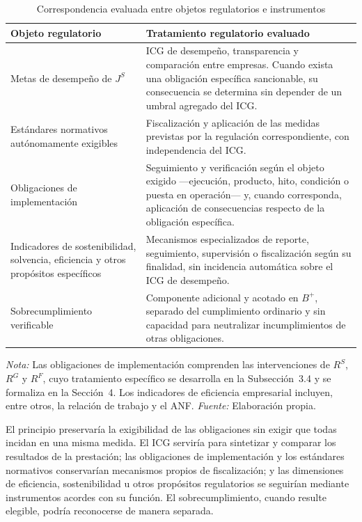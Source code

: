 \begin{table}[!t]
\centering
\caption{Correspondencia evaluada entre objetos regulatorios e instrumentos}
\label{tab:separacion_instrumentos}
\small
\renewcommand{\arraystretch}{1.20}
\setlength{\tabcolsep}{5pt}
\begin{tabularx}{\columnwidth}{@{}p{}X@{}}
\hline
\textbf{Objeto regulatorio} & \textbf{Tratamiento regulatorio evaluado} \\
\hline
Metas de desempeño de \(J^{S}\) &
ICG de desempeño, transparencia y comparación entre empresas. Cuando exista una obligación específica sancionable, su consecuencia se determina sin depender de un umbral agregado del ICG. \\
Estándares normativos autónomamente exigibles &
Fiscalización y aplicación de las medidas previstas por la regulación correspondiente, con independencia del ICG. \\
Obligaciones de implementación &
Seguimiento y verificación según el objeto exigido ---ejecución, producto, hito, condición o puesta en operación--- y, cuando corresponda, aplicación de consecuencias respecto de la obligación específica. \\
Indicadores de sostenibilidad, solvencia, eficiencia y otros propósitos específicos &
Mecanismos especializados de reporte, seguimiento, supervisión o fiscalización según su finalidad, sin incidencia automática sobre el ICG de desempeño. \\
Sobrecumplimiento verificable &
Componente adicional y acotado en \(B^{+}\), separado del cumplimiento ordinario y sin capacidad para neutralizar incumplimientos de otras obligaciones. \\
\hline
\end{tabularx}
\begin{flushleft}
\footnotesize
\textit{Nota:} Las obligaciones de implementación comprenden las intervenciones de \(R^{S}\), \(R^{G}\) y \(R^{F}\), cuyo tratamiento específico se desarrolla en la Subsección~3.4 y se formaliza en la Sección~4. Los indicadores de eficiencia empresarial incluyen, entre otros, la relación de trabajo y el ANF. \textit{Fuente:} Elaboración propia.
\end{flushleft}
\end{table}

El principio preservaría la exigibilidad de las obligaciones sin exigir que todas incidan en una misma medida. El ICG serviría para sintetizar y comparar los resultados de la prestación; las obligaciones de implementación y los estándares normativos conservarían mecanismos propios de fiscalización; y las dimensiones de eficiencia, sostenibilidad u otros propósitos regulatorios se seguirían mediante instrumentos acordes con su función. El sobrecumplimiento, cuando resulte elegible, podría reconocerse de manera separada.

